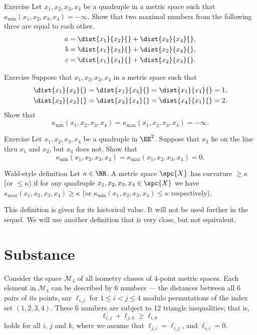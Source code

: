 \begin{thm}{Exercise}
Let $x_1,x_2,x_3,x_4$ be a quadruple in a metric space such that $\kappa_{\min}(x_1,x_2,x_3,x_4)=-\infty$.
Show that two maximal numbers from the following three are equal to each other.
\begin{align*}
a&=\dist{x_1}{x_2}{}+\dist{x_3}{x_4}{},
\\
b&=\dist{x_1}{x_3}{}+\dist{x_2}{x_4}{},
\\
c&=\dist{x_1}{x_4}{}+\dist{x_2}{x_3}{}.
\end{align*}


\end{thm}


\begin{thm}{Exercise}
Suppose that $x_1,x_2,x_3,x_4$ in a metric space
such that
\begin{align*}
\dist{x_1}{x_2}{}=\dist{x_1}{x_3}{}=\dist{x_1}{x_4}{}&=1,
\\
\dist{x_2}{x_3}{}=\dist{x_3}{x_4}{}=\dist{x_4}{x_1}{}&=2.
\end{align*}
Show that 
\[\kappa_{\min}(x_1,x_2,x_3,x_4)=\kappa_{\max}(x_1,x_2,x_3,x_4)=-\infty.\]
\end{thm}

\begin{thm}{Exercise}
Let $x_1,x_2,x_3,x_4$ be a quadruple in $\EE^2$.
Suppose that $x_3$ lie on the line thru $x_1$ and $x_2$,
but $x_4$ does not.
Show that 
\[\kappa_{\min}(x_1,x_2,x_3,x_4)=\kappa_{\max}(x_1,x_2,x_3,x_4)=0.\]
\end{thm}

\begin{thm}{Wald-style definition}
Let $\kappa\in \RR$.
A metric space $\spc{X}$ has curvature $\ge\kappa$ (or $\le\kappa$) 
if for any quadruple $x_1,x_2,x_3,x_4\in \spc{X}$ we have 
$\kappa_{\max}(x_1,x_2,x_3,x_4)\ge \kappa$ (or $\kappa_{\min}(x_1,x_2,x_3,x_4)\le \kappa$ respectively). 
\end{thm}

This definition is given for its historical value.
It will not be used further in the sequel.
We will use another definition that is very close, but not equivalent.

\section{Substance}\label{sec:manifesto}

Consider the space $\mathcal{M}_4$ of all isometry classes of 4-point metric spaces.
Each element in $\mathcal{M}_4$ can be described by 6 numbers 
 --- the distances between all 6 pairs of its points, say $\ell_{i,j}$ for $1\le i< j\le 4$ modulo permutations of the index set $(1,2,3,4)$.
These 6 numbers are subject to 12 triangle inequalities; that is,
\[\ell_{i,j}+\ell_{j,k}\ge \ell_{i,k}\]
holds for all $i$, $j$ and $k$, where we assume that $\ell_{j,i}=\ell_{i,j}$, and $\ell_{i,i}=0$.

